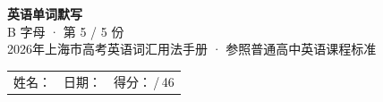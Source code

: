 \documentclass[10pt,a4paper]{article}
\begin{document}
\pagestyle{plain}

\begin{center}
{\LARGE\bfseries 英语单词默写}\\[0.22em]
{\large B 字母 · 第 5 / 5 份}\\[0.18em]
{\small 2026年上海市高考英语词汇用法手册 · 参照普通高中英语课程标准}
\end{center}

\vspace{0.25em}
\noindent\begin{tabular}{@{}p{}@{}p{}@{}p{}@{}}
姓名：\underline{\hspace{2.0cm}} & 日期：\underline{\hspace{2.0cm}} & 得分：\underline{\hspace{1.3cm}}\,/\,46 \\
\end{tabular}

\vspace{0.3em}

\vspace{0.08em}
\end{document}
